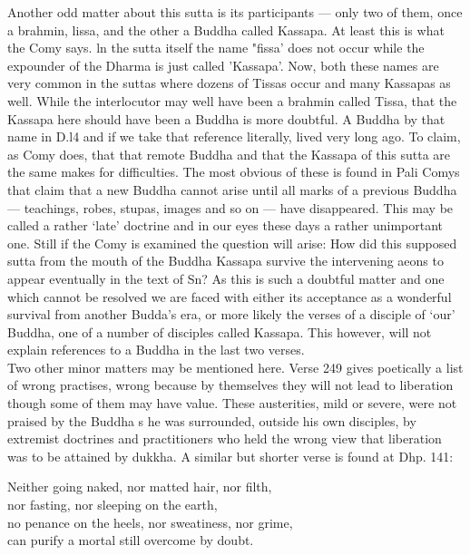 Another odd matter about this sutta is its participants — only two of them, once a brahmin, lissa, and the other a Buddha called Kassapa. At least this is what the Comy says. ln the sutta itself the name "ﬁssa' does not occur while the expounder of the Dharma is just called 'Kassapa'. Now, both these names are very common in the suttas where dozens of Tissas occur and many Kassapas as well. While the interlocutor may well have been a brahmin called Tissa, that the Kassapa here should have been a Buddha is more doubtful. A Buddha by that name in D.l4 and if we take that reference literally, lived very long ago. To claim, as Comy does, that that remote Buddha and that the Kassapa of this sutta are the same makes for difficulties. The most obvious of these is found in Pali Comys that claim that a new Buddha cannot arise until all marks of a previous Buddha — teachings, robes, stupas, images and so on — have disappeared. This may be called a rather `late' doctrine and in our eyes these days a rather unimportant one. Still if the Comy is examined the question will arise: How did this supposed sutta from the mouth of the Buddha Kassapa survive the intervening aeons to appear eventually in the text of Sn? As this is such a doubtful matter and one which cannot be resolved we are faced with either its acceptance as a wonderful survival from another Budda's era, or more likely the verses of a disciple of `our' Buddha, one of a number of disciples called Kassapa. This however, will not explain references to a Buddha in the last two verses.\\
 
Two other minor matters may be mentioned here. Verse 249 gives poetically a list of wrong practises, wrong because by themselves they will not lead to liberation though some of them may have value. These austerities, mild or severe, were not praised by the Buddha s he was surrounded, outside his own disciples, by extremist doctrines and practitioners who held the wrong view that liberation was to be attained by dukkha. A similar but shorter verse is found at Dhp. 141:

\begin{MyDescription}[]{}
Neither going naked, nor matted hair, nor filth,\\
nor fasting, nor sleeping on the earth,\\
no penance on the heels, nor sweatiness, nor grime,\\
can purify a mortal still overcome by doubt.
\end{MyDescription}

